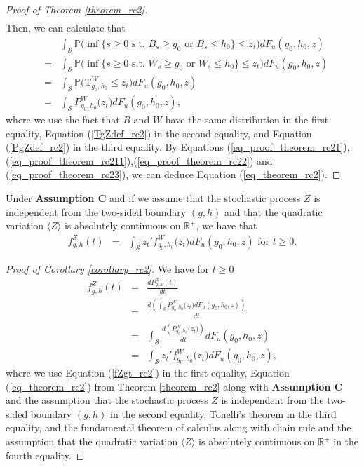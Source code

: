 \documentclass[aop]{imsart}
\theoremstyle{plain}
\theoremstyle{remark}
\newcommand{\reels}{\mathbb{R}}
\newcommand{\proba}{\mathbb{P}}
\newcommand{\Tau}{\mathrm{T}}
\begin{document}
\begin{proof}[Proof of Theorem \ref{theorem_rc2}]
\begin{eqnarray}
\end{eqnarray}
Then, we can calculate that
\begin{eqnarray}
\nonumber && \int_{\mathcal{S}} \proba \big(\inf \{s \geq 0 \text{ s.t. } B_{s}  \geq g_0 \text{ or } B_{s}  \leq h_0 \} \leq z_t) dF_{u}(g_0,h_0,z)\\ \nonumber & = & \int_{\mathcal{S}} \proba \big(\inf \{s \geq 0 \text{ s.t. } W_{s}  \geq g_0 \text{ or } W_{s}  \leq h_0 \} \leq z_t) dF_{u}(g_0,h_0,z)\\ \nonumber & = & \int_{\mathcal{S}} \proba \big(\Tau^W_{g_0,h_0}  \leq z_t \big)dF_{u}(g_0,h_0,z)\\ \label{eq_proof_theorem_rc23}
& = & \int_{\mathcal{S}} P_{g_0,h_0}^W\big(z_t\big) dF_{u}(g_0,h_0,z), 
\end{eqnarray}
where we use the fact that $B$ and $W$ have the same distribution in the first equality, Equation (\ref{TgZdef_rc2}) in the second equality, and Equation (\ref{PgZdef_rc2}) in the third equality. By Equations (\ref{eq_proof_theorem_rc21}), (\ref{eq_proof_theorem_rc211}),(\ref{eq_proof_theorem_rc22}) and (\ref{eq_proof_theorem_rc23}), we can deduce Equation (\ref{eq_theorem_rc2}).
\end{proof}

\begin{corollary}
\label{corollary_rc2}
Under \textbf{Assumption C} and if we assume that the stochastic process $Z$ is independent from the two-sided boundary $(g,h)$ and that the quadratic variation $\langle Z\rangle$ is absolutely continuous on $\reels^+$, we have that
\begin{eqnarray}
\label{eq_corollary_rc2}
f_{g,h}^Z (t) & = & \int_{\mathcal{S}} z_t ' f_{g_0,h_0}^W \big(z_t\big) dF_{u}(g_0,h_0,z) \text{ for } t \geq 0.
\end{eqnarray}
\end{corollary}
\begin{proof}[Proof of Corollary \ref{corollary_rc2}]
We have for $t \geq 0$
\begin{eqnarray*}
f_{g,h}^Z (t) & = & \frac{dP_{g,h}^Z(t)}{dt}\\
& = & \frac{d(\int_{\mathcal{S}} P_{g_0,h_0}^W \big(z_t\big) dF_{u}(g_0,h_0,z))}{dt}\\
& = & \int_{\mathcal{S}} \frac{d(P_{g_0,h_0}^W \big(z_t\big))}{dt} dF_{u}(g_0,h_0,z)\\
& = & \int_{\mathcal{S}} z_t ' f_{g_0,h_0}^W \big(z_t\big) dF_{u}(g_0,h_0,z),
\end{eqnarray*}
where we use Equation (\ref{fZgt_rc2}) in the first equality, Equation (\ref{eq_theorem_rc2}) from Theorem \ref{theorem_rc2} along with \textbf{Assumption C} and the assumption that the stochastic process $Z$ is independent from the two-sided boundary $(g,h)$ in the second equality, Tonelli's theorem in the third equality, and the fundamental theorem of calculus along with chain rule and the assumption that the quadratic variation $\langle Z\rangle$ is absolutely continuous on $\reels^+$ in the fourth equality.
\end{proof}
\end{document}
